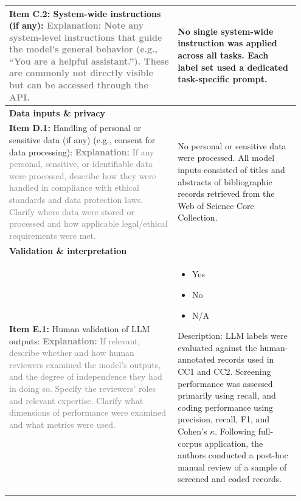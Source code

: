 \documentclass[12pt]{article}
\newcommand{\checked}{\ding{110}}
\newcommand{\unchecked}{\ding{111}}
\begin{document}
\begin{landscape}
{\begin{longtable}{|p{0.55\linewidth}|p{0.40\linewidth}|}
\hline
\textbf{Item C.2:} System-wide instructions (if any): \textcolor{gray}{{\footnotesize \textbf{Explanation:} Note any system-level instructions that guide the model's general behavior (e.g., ``You are a helpful assistant.''). These are commonly not directly visible but can be accessed through the API.}} & No single system-wide instruction was applied across all tasks. Each label set used a dedicated task-specific prompt. \\
\hline
\multicolumn{2}{|l|}{\cellcolor{green!20}\textbf{Data inputs \& privacy}} \\
\hline
\textbf{Item D.1:} Handling of personal or sensitive data (if any) (e.g., consent for data processing): \textcolor{gray}{{\footnotesize \textbf{Explanation:} If any personal, sensitive, or identifiable data were processed, describe how they were handled in compliance with ethical standards and data protection laws. Clarify where data were stored or processed and how applicable legal/ethical requirements were met.}} & No personal or sensitive data were processed. All model inputs consisted of titles and abstracts of bibliographic records retrieved from the Web of Science Core Collection. \\
\hline
\multicolumn{2}{|l|}{\cellcolor{green!20}\textbf{Validation \& interpretation}} \\
\hline
\textbf{Item E.1:} Human validation of LLM outputs: \textcolor{gray}{{\footnotesize \textbf{Explanation:} If relevant, describe whether and how human reviewers examined the model's outputs, and the degree of independence they had in doing so. Specify the reviewers' roles and relevant expertise. Clarify what dimensions of performance were examined and what metrics were used.}} & \begin{itemize}[leftmargin=*]\setlength{\itemsep}{0pt}\setlength{\parskip}{0pt} \item[\checked] Yes \item[\unchecked] No \item[\unchecked] N/A \end{itemize} Description: LLM labels were evaluated against the human-annotated records used in CC1 and CC2. Screening performance was assessed primarily using recall, and coding performance using precision, recall, F1, and Cohen's $\kappa$. Following full-corpus application, the authors conducted a post-hoc manual review of a sample of screened and coded records.


\end{longtable}}
\end{landscape}
\end{document}

